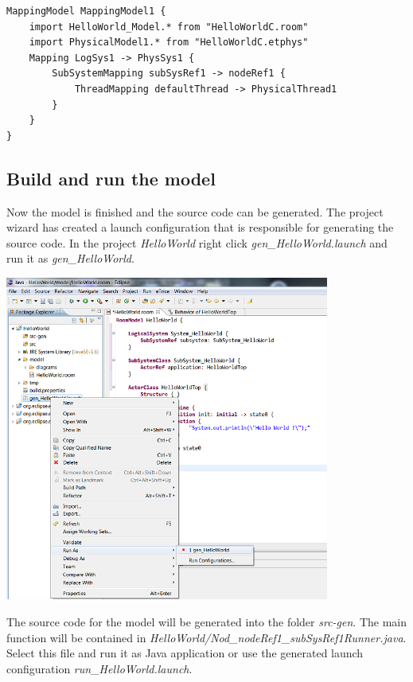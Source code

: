 \begin{lstlisting}[language=etMap]
MappingModel MappingModel1 {
	import HelloWorld_Model.* from "HelloWorldC.room"
	import PhysicalModel1.* from "HelloWorldC.etphys"
	Mapping LogSys1 -> PhysSys1 {
		SubSystemMapping subSysRef1 -> nodeRef1 {
			ThreadMapping defaultThread -> PhysicalThread1
		}
	}
}
\end{lstlisting}



\subsection{Build and run the model}

Now the model is finished and the source code can be generated. The project wizard has created a launch 
configuration that is responsible for generating the source code. In the project \textit{HelloWorld} right click \emph{gen\_HelloWorld.launch} and run it as \emph{gen\_HelloWorld}. 

\includegraphics[width=0.8\textwidth]{images/015-HelloWorld06.png}

The source code for the model will be generated into the folder \emph{src-gen}. The main function will be contained in \emph{HelloWorld/Nod\_nodeRef1\_subSysRef1Runner.java}.
Select this file and run it as Java application or use the generated launch configuration \emph{run\_HelloWorld.launch}.

